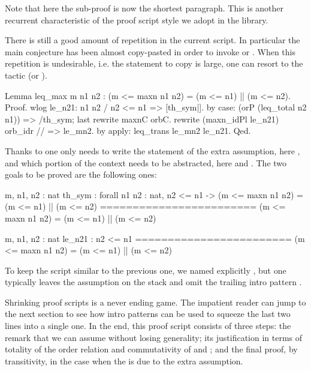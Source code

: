 Note that here the sub-proof is now the shortest paragraph.
This is another recurrent characteristic of the proof script style
we adopt in the \mcbMC{} library.

There is still a good amount of repetition in the current script.
In particular the main conjecture has been almost copy-pasted in
order to invoke  or .  When this repetition
is undesirable, i.e. the statement to copy is large, one
can resort to the  tactic (or ).

\begin{coq}{}{}
Lemma leq_max m n1 n2 : (m <= maxn n1 n2) = (m <= n1) || (m <= n2).
Proof.
wlog le_n21: n1 n2 / n2 <= n1  => [th_sym|].
  by case: (orP (leq_total n2 n1)) => /th_sym; last rewrite maxnC orbC.
rewrite (maxn_idPl le_n21) orb_idr // => le_mn2.
by apply: leq_trans le_mn2 le_n21.
Qed.
\end{coq}

Thanks to  one only needs to write the statement of the extra
assumption, here , and which portion of the context needs
to be abstracted, here  and .
The two goals to be proved are the following ones:

\begin{coqout}{}{}
m, n1, n2 : nat
th_sym : forall n1 n2 : nat, n2 <= n1 ->
           (m <= maxn n1 n2) = (m <= n1) || (m <= n2)
========================
(m <= maxn n1 n2) = (m <= n1) || (m <= n2)
\end{coqout}

\begin{coqout}{}{}
m, n1, n2 : nat
le_n21 : n2 <= n1
========================
(m <= maxn n1 n2) = (m <= n1) || (m <= n2)
\end{coqout}

To keep the script similar to the previous one, we named explicitly
, but one typically leaves the assumption on the stack
and omit the trailing intro pattern \C{=> [th_sym|]}.

Shrinking proof scripts is a never ending game.  The impatient reader can
jump to the next section to see
how intro patterns can be used to squeeze the last two lines into a
single one.  In the end, this proof script consists of three steps:
the remark that we can
assume  without losing generality; its justification in
terms of totality of the order relation and commutativity of 
and \C{||}; and the final proof, by transitivity, in the case when
the  is  due to the extra assumption.

